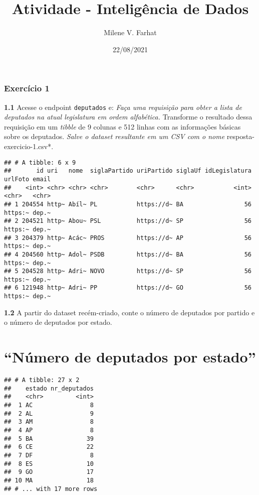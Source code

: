 \documentclass[]{article}
\title{Atividade - Inteligência de Dados}
\author{Milene V. Farhat}
\date{22/08/2021}
\begin{document}
\maketitle

\hypertarget{exercuxedcio-1}{%
\subsubsection{Exercício 1}\label{exercuxedcio-1}}

\textbf{1.1} Acesse o endpoint \texttt{deputados} e: \emph{Faça uma
requisição para obter a lista de deputados na atual legislatura em ordem
alfabética. }Transforme o resultado dessa requisição em um \emph{tibble}
de 9 colunas e 512 linhas com as informações básicas sobre os deputados.
\emph{Salve o dataset resultante em um CSV com o nome
}resposta-exercicio-1.csv*.

\begin{verbatim}
## # A tibble: 6 x 9
##       id uri   nome  siglaPartido uriPartido siglaUf idLegislatura urlFoto email
##    <int> <chr> <chr> <chr>        <chr>      <chr>           <int> <chr>   <chr>
## 1 204554 http~ Abíl~ PL           https://d~ BA                 56 https:~ dep.~
## 2 204521 http~ Abou~ PSL          https://d~ SP                 56 https:~ dep.~
## 3 204379 http~ Acác~ PROS         https://d~ AP                 56 https:~ dep.~
## 4 204560 http~ Adol~ PSDB         https://d~ BA                 56 https:~ dep.~
## 5 204528 http~ Adri~ NOVO         https://d~ SP                 56 https:~ dep.~
## 6 121948 http~ Adri~ PP           https://d~ GO                 56 https:~ dep.~
\end{verbatim}

\textbf{1.2} A partir do dataset recém-criado, conte o número de
deputados por partido e o número de deputados por estado.

\hypertarget{nuxfamero-de-deputados-por-estado}{%
\section{``Número de deputados por
estado''}\label{nuxfamero-de-deputados-por-estado}}

\begin{verbatim}
## # A tibble: 27 x 2
##    estado nr_deputados
##    <chr>         <int>
##  1 AC                8
##  2 AL                9
##  3 AM                8
##  4 AP                8
##  5 BA               39
##  6 CE               22
##  7 DF                8
##  8 ES               10
##  9 GO               17
## 10 MA               18
## # ... with 17 more rows
\end{verbatim}
\end{document}
